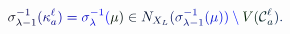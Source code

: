 \documentclass[12pt]{article}
\begin{document}
\makeatletter
\renewcommand*{\@textcolor}[3]{%
  \protect\leavevmode
  \begingroup
    \color#1{#2}#3%
  \endgroup
}
\makeatother
\begin{displaymath}
\mathcolor[RGB]{0,0,15}{\sigma} _ { \mathcolor[RGB]{0,0,30}{\lambda} \mathcolor[RGB]{0,0,45}{-} \mathcolor[RGB]{0,0,60}{1} } ^ { \mathcolor[RGB]{0,0,75}{-} \mathcolor[RGB]{0,0,90}{1} } \mathcolor[RGB]{0,0,105}{(} \mathcolor[RGB]{0,0,120}{\kappa} _ { \mathcolor[RGB]{0,0,135}{a} } ^ { \mathcolor[RGB]{0,0,150}{\ell} } \mathcolor[RGB]{0,0,165}{)} \mathcolor[RGB]{0,0,180}{=} \mathcolor[RGB]{0,0,195}{\sigma} _ { \mathcolor[RGB]{0,0,210}{\lambda} } ^ { \mathcolor[RGB]{0,0,225}{-} \mathcolor[RGB]{0,0,240}{1} } \mathcolor[RGB]{0,0,255}{(} \mathcolor[RGB]{0,15,0}{\mu} \mathcolor[RGB]{0,15,15}{)} \mathcolor[RGB]{0,15,30}{\in} \mathcolor[RGB]{0,15,45}{N} _ { \mathcolor[RGB]{0,15,60}{X} _ { \mathcolor[RGB]{0,15,75}{L} } } \mathcolor[RGB]{0,15,90}{(} \mathcolor[RGB]{0,15,105}{\sigma} _ { \mathcolor[RGB]{0,15,120}{\lambda} \mathcolor[RGB]{0,15,135}{-} \mathcolor[RGB]{0,15,150}{1} } ^ { \mathcolor[RGB]{0,15,165}{-} \mathcolor[RGB]{0,15,180}{1} } \mathcolor[RGB]{0,15,195}{(} \mathcolor[RGB]{0,15,210}{\mu} \mathcolor[RGB]{0,15,225}{)} \mathcolor[RGB]{0,15,240}{)} \mathcolor[RGB]{0,15,255}{\setminus} \mathcolor[RGB]{0,30,0}{V} \mathcolor[RGB]{0,30,15}{(} \mathcal { \mathcolor[RGB]{0,30,30}{C} } _ { \mathcolor[RGB]{0,30,45}{a} } ^ { \mathcolor[RGB]{0,30,60}{\ell} } \mathcolor[RGB]{0,30,75}{)} \mathcolor[RGB]{0,30,90}{.}
\end{displaymath}
\end{document}
